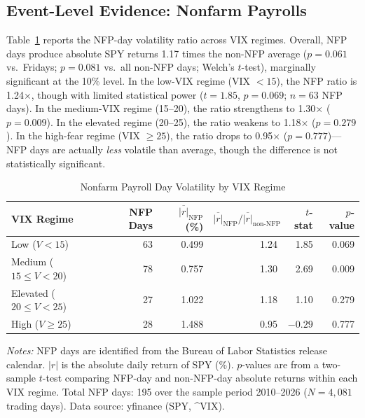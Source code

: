 \documentclass[12pt,a4paper]{article}
\begin{document}
\subsection{Event-Level Evidence: Nonfarm Payrolls}
\label{sec:nfp}

Table~\ref{tab:nfp} reports the NFP-day volatility ratio across VIX regimes. Overall, NFP days produce absolute SPY returns 1.17 times the non-NFP average ($p = 0.061$ vs.\ Fridays; $p = 0.081$ vs.\ all non-NFP days; Welch's $t$-test), marginally significant at the 10\% level. In the low-VIX regime (VIX $< 15$), the NFP ratio is 1.24$\times$, though with limited statistical power ($t = 1.85$, $p = 0.069$; $n = 63$ NFP days). In the medium-VIX regime (15--20), the ratio strengthens to 1.30$\times$ ($p = 0.009$). In the elevated regime (20--25), the ratio weakens to 1.18$\times$ ($p = 0.279$). In the high-fear regime (VIX $\geq 25$), the ratio drops to 0.95$\times$ ($p = 0.777$)---NFP days are actually \textit{less} volatile than average, though the difference is not statistically significant.

\begin{table}[H]
\centering
\caption{Nonfarm Payroll Day Volatility by VIX Regime}
\label{tab:nfp}
\begin{threeparttable}
\begin{tabular}{lrrrrr}
\toprule
VIX Regime & NFP Days & $\overline{|r|}_{\text{NFP}}$ (\%) & $\overline{|r|}_{\text{NFP}} / \overline{|r|}_{\text{non-NFP}}$ & $t$-stat & $p$-value \\
\midrule
Low ($V < 15$)              & 63  & 0.499 & 1.24 & 1.85 & 0.069 \\
Medium ($15 \leq V < 20$)   & 78  & 0.757 & 1.30 & 2.69 & 0.009 \\
Elevated ($20 \leq V < 25$) & 27  & 1.022 & 1.18 & 1.10 & 0.279 \\
High ($V \geq 25$)          & 28  & 1.488 & 0.95 & $-0.29$ & 0.777 \\
\bottomrule
\end{tabular}
\begin{tablenotes}
\small
\item \textit{Notes:} NFP days are identified from the Bureau of Labor Statistics release calendar. $|r|$ is the absolute daily return of SPY (\%). $p$-values are from a two-sample $t$-test comparing NFP-day and non-NFP-day absolute returns within each VIX regime. Total NFP days: 195 over the sample period 2010--2026 ($N = 4{,}081$ trading days). Data source: yfinance (SPY, \^{}VIX).
\end{tablenotes}
\end{threeparttable}
\end{table}
\end{document}
